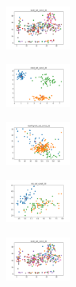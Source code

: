 \begin{figure}[H]
\begin{subfigure}
    \end{subfigure}
    \hfill
    \begin{subfigure}
        \centering
        \includegraphics[width=0.234\textwidth]{img/ageun/ecoli_set_const_20_589741062_clust.png}
    \end{subfigure}
    \hfill
    \begin{subfigure}
        \centering
        \includegraphics[width=0.234\textwidth]{img/ageun/rand_set_const_20_589741062_clust.png}
    \end{subfigure}
    \hfill
    \begin{subfigure}
        \centering
        \includegraphics[width=0.234\textwidth]{img/ageun/newthyroid_set_const_20_589741062_clust.png}
    \end{subfigure}
    \hfill
    \begin{subfigure}
        \centering
        \includegraphics[width=0.234\textwidth]{img/ageun/iris_set_const_20_277451237_clust.png}
    \end{subfigure}
    \hfill
    \begin{subfigure}
        \centering
        \includegraphics[width=0.234\textwidth]{img/ageun/ecoli_set_const_20_277451237_clust.png}
    \end{subfigure}
    \hfill

\end{figure}
